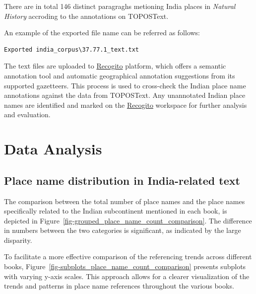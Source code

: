 \documentclass[
  12pt,
]{article}
\begin{document}
There are in total 146 distinct paragraghs metioning India places in
\emph{Natural History} accroding to the annotations on TOPOSText.

An example of the exported file name can be referred as follows:

\begin{verbatim}
Exported india_corpus\37.77.1_text.txt
\end{verbatim}

The text files are uploaded to
\href{https://recogito.pelagios.org/}{Recogito} platform, which offers a
semantic annotation tool and automatic geographical annotation
suggestions from its supported gazetteers. This process is used to
cross-check the Indian place name annotations against the data from
TOPOSText. Any unannotated Indian place names are identified and marked
on the \href{https://recogito.pelagios.org/}{Recogito} workspace for
further analysis and evaluation.

\hypertarget{data-analysis}{%
\section{Data Analysis}\label{data-analysis}}

\hypertarget{place-name-distribution-in-india-related-text}{%
\subsection{Place name distribution in India-related
text}\label{place-name-distribution-in-india-related-text}}

The comparison between the total number of place names and the place
names specifically related to the Indian subcontinent mentioned in each
book, is depicted in
Figure~\ref{fig-grouped_place_name_count_comparison}. The difference in
numbers between the two categories is significant, as indicated by the
large disparity.

To facilitate a more effective comparison of the referencing trends
across different books,
Figure~\ref{fig-subplots_place_name_count_comparison} presents subplots
with varying y-axis scales. This approach allows for a clearer
visualization of the trends and patterns in place name references
throughout the various books.
\end{document}
